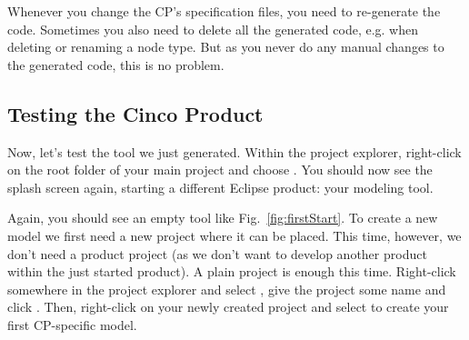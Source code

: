 \documentclass[a4paper,american,12pt]{scrreprt}
\begin{document}
Whenever you change the CP's specification files, you need to re-generate the
code. Sometimes you also need to delete all the generated code, e.g. when
deleting or renaming a node type. But as you never do any manual changes to the
generated code, this is no problem.


\subsection{Testing the Cinco Product}

Now, let's test the tool we just generated. Within the project explorer,
right-click on the root folder of your main project and choose . You should now see the \cinco splash screen again,
starting a different Eclipse product: your modeling tool. \footnotemark


Again, you should see an empty tool like Fig.~\ref{fig:firstStart}. To create a
new model we first need a new project where it can be placed. This time,
however, we don't need a \cinco product project (as we don't want to develop
another \cinco product within the just started \cinco product). A plain project
is enough this time. Right-click somewhere in the project explorer and select
, give the project some name
and click . Then, right-click on your newly created project and
select  to create your
first CP-specific model.
\end{document}
